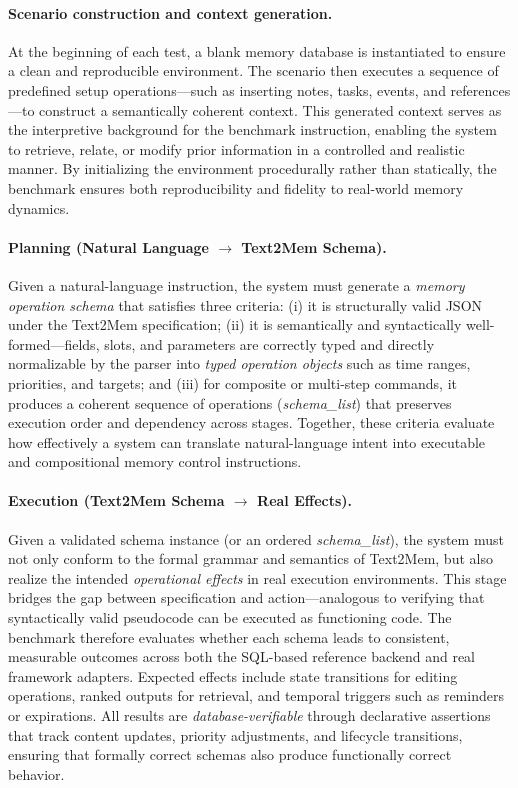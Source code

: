 \documentclass[conference]{IEEEtran}
\begin{document}
\paragraph{Scenario construction and context generation.}
At the beginning of each test, a blank memory database is instantiated to ensure a clean and reproducible environment.  
The scenario then executes a sequence of predefined setup operations—such as inserting notes, tasks, events, and references—to construct a semantically coherent context.  
This generated context serves as the interpretive background for the benchmark instruction, enabling the system to retrieve, relate, or modify prior information in a controlled and realistic manner.  
By initializing the environment procedurally rather than statically, the benchmark ensures both reproducibility and fidelity to real-world memory dynamics.

\paragraph{Planning (Natural Language $\rightarrow$ Text2Mem Schema).}
Given a natural-language instruction, the system must generate a \emph{memory operation schema} that satisfies three criteria:  
(i) it is structurally valid JSON under the Text2Mem specification;  
(ii) it is semantically and syntactically well-formed—fields, slots, and parameters are correctly typed and directly normalizable by the parser into \emph{typed operation objects} such as time ranges, priorities, and targets; and  
(iii) for composite or multi-step commands, it produces a coherent sequence of operations (\emph{schema\_list}) that preserves execution order and dependency across stages.  
Together, these criteria evaluate how effectively a system can translate natural-language intent into executable and compositional memory control instructions.

\paragraph{Execution (Text2Mem Schema $\rightarrow$ Real Effects).}
Given a validated schema instance (or an ordered \emph{schema\_list}), the system must not only conform to the formal grammar and semantics of Text2Mem, but also realize the intended \emph{operational effects} in real execution environments.  
This stage bridges the gap between specification and action—analogous to verifying that syntactically valid pseudocode can be executed as functioning code.  
The benchmark therefore evaluates whether each schema leads to consistent, measurable outcomes across both the SQL-based reference backend and real framework adapters.  
Expected effects include state transitions for editing operations, ranked outputs for retrieval, and temporal triggers such as reminders or expirations.  
All results are \emph{database-verifiable} through declarative assertions that track content updates, priority adjustments, and lifecycle transitions, ensuring that formally correct schemas also produce functionally correct behavior.
\end{document}
